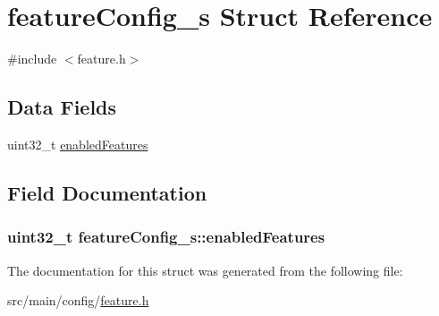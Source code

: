 \hypertarget{structfeatureConfig__s}{\section{feature\+Config\+\_\+s Struct Reference}
\label{structfeatureConfig__s}
}


{\ttfamily \#include $<$feature.\+h$>$}

\subsection*{Data Fields}
\begin{DoxyCompactItemize}
\item 
uint32\+\_\+t \hyperlink{structfeatureConfig__s_a5cd8eef4dbbcb6d24b6f60db3929a6be}{enabled\+Features}
\end{DoxyCompactItemize}


\subsection{Field Documentation}
\hypertarget{structfeatureConfig__s_a5cd8eef4dbbcb6d24b6f60db3929a6be}{
\subsubsection[{enabled\+Features}]{\setlength{\rightskip}{0pt plus 5cm}uint32\+\_\+t feature\+Config\+\_\+s\+::enabled\+Features}}\label{structfeatureConfig__s_a5cd8eef4dbbcb6d24b6f60db3929a6be}


The documentation for this struct was generated from the following file\+:\begin{DoxyCompactItemize}
\item 
src/main/config/\hyperlink{feature_8h}{feature.\+h}\end{DoxyCompactItemize}
